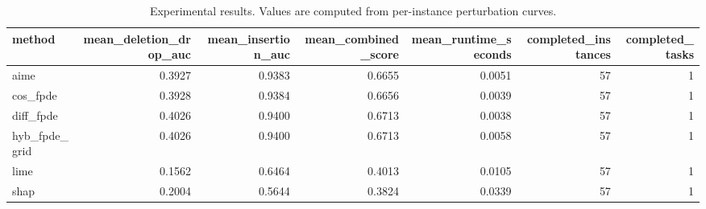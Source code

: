 \begin{table}[t]
\caption{Experimental results. Values are computed from per-instance perturbation curves.}
\label{tab:main_results_computed}
\centering
\begin{tabular}{lrrrrrr}
\toprule
method & mean\_deletion\_drop\_auc & mean\_insertion\_auc & mean\_combined\_score & mean\_runtime\_seconds & completed\_instances & completed\_tasks \\
\midrule
aime & 0.3927 & 0.9383 & 0.6655 & 0.0051 & 57 & 1 \\
cos\_fpde & 0.3928 & 0.9384 & 0.6656 & 0.0039 & 57 & 1 \\
diff\_fpde & 0.4026 & 0.9400 & 0.6713 & 0.0038 & 57 & 1 \\
hyb\_fpde\_grid & 0.4026 & 0.9400 & 0.6713 & 0.0058 & 57 & 1 \\
lime & 0.1562 & 0.6464 & 0.4013 & 0.0105 & 57 & 1 \\
shap & 0.2004 & 0.5644 & 0.3824 & 0.0339 & 57 & 1 \\
\bottomrule
\end{tabular}

\end{table}
